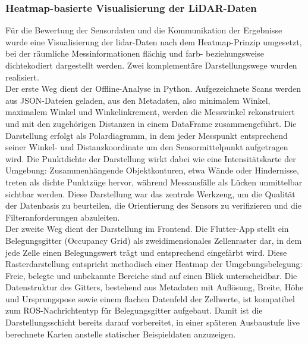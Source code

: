 \subsubsection{Heatmap-basierte Visualisierung der LiDAR-Daten}
Für die Bewertung der Sensordaten und die Kommunikation der Ergebnisse wurde eine Visualisierung der \gls{lidar}-Daten nach dem Heatmap-Prinzip umgesetzt, bei der räumliche Messinformationen flächig und farb- beziehungsweise dichtekodiert dargestellt werden. Zwei komplementäre Darstellungswege wurden realisiert.
\\
Der erste Weg dient der Offline-Analyse in Python. Aufgezeichnete Scans werden aus JSON-Dateien geladen, aus den Metadaten, also minimalem Winkel, maximalem Winkel und Winkelinkrement, werden die Messwinkel rekonstruiert und mit den zugehörigen Distanzen in einem DataFrame zusammengeführt. Die Darstellung erfolgt als Polardiagramm, in dem jeder Messpunkt entsprechend seiner Winkel- und Distanzkoordinate um den Sensormittelpunkt aufgetragen wird. Die Punktdichte der Darstellung wirkt dabei wie eine Intensitätskarte der Umgebung: Zusammenhängende Objektkonturen, etwa Wände oder Hindernisse, treten als dichte Punktzüge hervor, während Messausfälle als Lücken unmittelbar sichtbar werden. Diese Darstellung war das zentrale Werkzeug, um die Qualität der Datenbasis zu beurteilen, die Orientierung des Sensors zu verifizieren und die Filteranforderungen abzuleiten.
\\
Der zweite Weg dient der Darstellung im Frontend. Die Flutter-App stellt ein Belegungsgitter (Occupancy Grid) \cite{hornung2013octomap} als zweidimensionales Zellenraster dar, in dem jede Zelle einen Belegungswert trägt und entsprechend eingefärbt wird. Diese Rasterdarstellung entspricht methodisch einer Heatmap der Umgebungsbelegung: Freie, belegte und unbekannte Bereiche sind auf einen Blick unterscheidbar. Die Datenstruktur des Gitters, bestehend aus Metadaten mit Auflösung, Breite, Höhe und Ursprungspose sowie einem flachen Datenfeld der Zellwerte, ist kompatibel zum ROS-Nachrichtentyp für Belegungsgitter aufgebaut. Damit ist die Darstellungsschicht bereits darauf vorbereitet, in einer späteren Ausbaustufe live berechnete Karten anstelle statischer Beispieldaten anzuzeigen.

